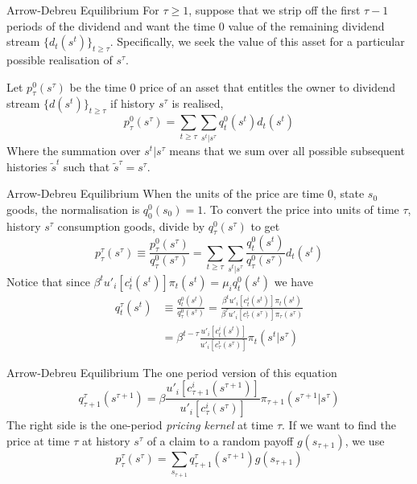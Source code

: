 \documentclass[aspectratio=169,xcolor=dvipsnames]{beamer}
\begin{document}
\begin{frame}{Arrow-Debreu Equilibrium}
    For $\tau \ge 1$, suppose that we strip off the first $\tau - 1$ periods of the dividend and want the time 0 value of the remaining dividend stream $\{d_t(s^t)\}_{t \ge \tau}$. Specifically, we seek the value of this asset for a particular possible realisation of $s^\tau$.

    Let $p^0_\tau(s^\tau)$ be the time 0 price of an asset that entitles the owner to dividend stream $\{d(s^t)\}_{t \ge \tau}$ if history $s^\tau$ is realised,
    \[
        p^0_\tau(s^\tau) = \sum_{t \ge \tau} \sum_{s^t | s^\tau} q^0_t(s^t) d_t(s^t)
    \]
    Where the summation over $s^t | s^\tau$ means that we sum over all possible subsequent histories $\tilde s^t$ such that $\tilde s^\tau = s^\tau$.
\end{frame}

\begin{frame}{Arrow-Debreu Equilibrium}
    When the units of the price are time 0, state $s_0$ goods, the normalisation is $q^0_0(s_0) = 1$. To convert the price into units of time $\tau$, history $s^\tau$ consumption goods, divide by $q^0_\tau(s^\tau)$ to get
    \[
        p^\tau_\tau(s^\tau) \equiv \frac{p^0_\tau(s^\tau)}{q^0_\tau(s^\tau)} = \sum_{t \ge \tau} \sum_{s^t | s^\tau} \frac{q^0_t(s^t)}{q^0_\tau(s^\tau)} d_t(s^t)
    \]
    Notice that since $\beta^t u'_i[c^i_t(s^t)] \pi_t(s^t) = \mu_i q^0_t(s^t)$ we have
    \begin{align*}
        q^\tau_t(s^t) &\equiv \frac{q^0_t(s^t)}{q^0_\tau(s^\tau)} = \frac{\beta^t u'_i[c^i_t(s^t)] \pi_t(s^t)}{\beta^\tau u'_i[c^i_\tau(s^\tau)] \pi_\tau(s^\tau)} \\
        &= \beta^{t-\tau} \frac{u'_i[c^i_t(s^t)]}{u'_i[c^i_\tau(s^\tau)]} \pi_t(s^t | s^\tau)
    \end{align*}
\end{frame}

\begin{frame}{Arrow-Debreu Equilibrium}
    The one period version of this equation
    \[
        q^\tau_{\tau+1}(s^{\tau+1}) = \beta \frac{u'_i[c^i_{\tau+1}(s^{\tau+1})]}{u'_i[c^i_\tau(s^\tau)]} \pi_{\tau+1}(s^{\tau+1} | s^\tau)
    \]
    The right side is the one-period \emph{pricing kernel} at time $\tau$. If we want to find the price at time $\tau$ at history $s^\tau$ of a claim to a random payoff $g(s_{\tau+1})$, we use
    \[
        p^\tau_\tau(s^\tau) = \sum_{s_{\tau+1}} q^\tau_{\tau+1}(s^{\tau+1}) g(s_{\tau+1})
    \]
\end{frame}
\end{document}
